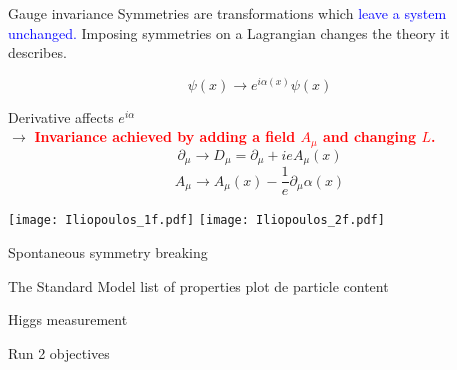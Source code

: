 \documentclass[a4paper]{beamer}
\begin{document}
\begin{frame}{Gauge invariance}
  Symmetries are transformations which \textcolor{blue}{leave a system unchanged.}
  Imposing symmetries on a Lagrangian changes the theory it describes.
  \vfill
  
    \begin{equation}
      \psi(x)\rightarrow e^{i\alpha(x)}\psi(x)
    \end{equation}

    Derivative affects $e^{i\alpha}$\\
    $\rightarrow$ \textcolor{red}{\bf Invariance achieved by adding a field $A_\mu$ and changing $L$.}
    \begin{equation}
      \label{eq:orgc79752f}
      \partial_\mu\rightarrow D_\mu=\partial_\mu+ieA_\mu(x)
    \end{equation}
    \begin{equation}
      \label{eq:orge69917a}
      A_{\mu} \rightarrow A_\mu(x) - \frac{1}{e} {\partial_{\mu} \alpha(x)}
    \end{equation}


    \texttt{[image: Iliopoulos\_1f.pdf]}
    \texttt{[image: Iliopoulos\_2f.pdf]}


\end{frame}
\begin{frame}{Spontaneous symmetry breaking}
\end{frame}
\begin{frame}{The Standard Model}
  list of properties
  plot de particle content
\end{frame}
\begin{frame}{Higgs measurement}
\end{frame}
\begin{frame}{Run 2 objectives}
\end{frame}

\end{document}
